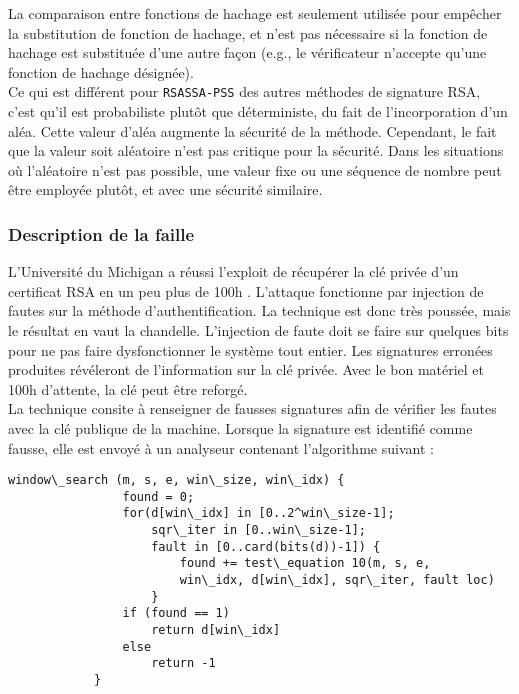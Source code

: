 La comparaison entre fonctions de hachage est seulement utilisée pour empêcher la substitution de fonction de hachage, et n'est pas nécessaire si la fonction de hachage est substituée d'une autre façon (e.g., le vérificateur n'accepte qu'une fonction de hachage désignée).\\ 


Ce qui est différent pour \texttt{RSASSA-PSS} des autres méthodes de signature RSA, c'est qu'il est probabiliste plutôt que déterministe, du fait de  l'incorporation d'un aléa. Cette valeur d'aléa augmente la sécurité de la méthode. Cependant, le fait que la valeur soit aléatoire n'est pas critique pour la sécurité. Dans les situations où l'aléatoire n'est pas possible, une valeur fixe ou une séquence de nombre peut être employée plutôt, et avec une sécurité similaire.

		\subsubsection{Description de la faille}
		
			L'Université du Michigan a réussi l'exploit de récupérer la clé privée d'un certificat RSA en un peu plus de 100h \cite{andrea2010RSA} \cite{opensslvuln2010}. 	L'attaque fonctionne par injection de fautes \cite{fault2008lawson} sur la méthode d'authentification. La technique est donc très poussée, mais le résultat en vaut la chandelle. L'injection de faute doit se faire sur quelques bits pour ne pas faire dysfonctionner le système tout entier. Les signatures erronées produites révéleront de l'information sur la clé privée. Avec le bon matériel et 100h d'attente, la clé peut être reforgé.\\

			La technique consite à renseigner de fausses signatures afin de vérifier les fautes avec la clé publique de la machine. Lorsque la signature est identifié comme fausse, elle est envoyé à un analyseur contenant l'algorithme suivant :

			\begin{lstlisting}[style=customc,caption=window\_search.c, label=windowssearch]
			window\_search (m, s, e, win\_size, win\_idx) {
				found = 0;
				for(d[win\_idx] in [0..2^win\_size-1];
					sqr\_iter in [0..win\_size-1];
					fault in [0..card(bits(d))-1]) {
						found += test\_equation 10(m, s, e,
						win\_idx, d[win\_idx], sqr\_iter, fault loc)
					}
				if (found == 1) 
					return d[win\_idx]
				else 
					return -1
			}
			\end{lstlisting}

